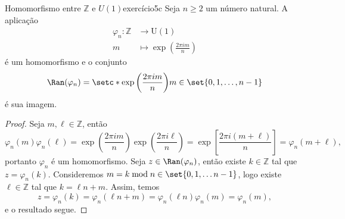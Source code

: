 \begin{lemma}{Homomorfismo entre \(\mathbb{Z}\) e \(U(1)\)}{exercício5c}
    Seja \(n \geq 2\) um número natural. A aplicação
    \begin{align*}
        \varphi_n : \mathbb{Z} &\to \mathrm{U}(1)\\
                             m &\mapsto \exp\left(\frac{2\pi i m}{n}\right)
    \end{align*}
    é um homomorfismo e o conjunto
    \begin{equation*}
        \Ran(\varphi_n) = \setc*{\exp\left(\frac{2\pi i m}{n}\right)}{m \in \set{0, 1,\dots, n-1}}
    \end{equation*}
    é sua imagem.
\end{lemma}
\begin{proof}
    Seja \(m, \ell \in \mathbb{Z}\), então
    \begin{equation*}
        \varphi_n(m)\varphi_n(\ell) = \exp\left(\frac{2\pi i m}{n}\right)\exp\left(\frac{2\pi i \ell}{n}\right) = \exp\left[\frac{2\pi i(m+ \ell)}{n}\right] = \varphi_n(m + \ell),
    \end{equation*}
    portanto \(\varphi_n\) é um homomorfismo. Seja \(z \in \Ran(\varphi_n)\), então existe \(k \in \mathbb{Z}\) tal que \(z = \varphi_n(k)\). Consideremos \(m = k \bmod n \in \set{0, 1,\dots n-1}\), logo existe \(\ell \in \mathbb{Z}\) tal que \(k = \ell n + m\). Assim, temos
    \begin{equation*}
        z = \varphi_n(k) = \varphi_n(\ell n + m) = \varphi_n(\ell n)\varphi_n(m) = \varphi_n(m),
    \end{equation*}
    e o resultado segue.
\end{proof}

